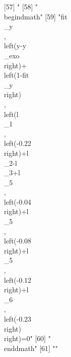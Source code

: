 [57] "%
[58] "\\begin{dmath}"                                                                                                                                                                                                                                                                                
[59] "{{fit\\_y}}\\, \\left({y}-{{y\\_exo}}\\right)+\\left(1-{{fit\\_y}}\\right)\\, \\left({{l\\_1}}\\, \\left(-0.22\\right)+{{l\\_2}}-{{l\\_3}}+{{l\\_5}}\\, \\left(-0.04\\right)+{{l\\_5}}\\, \\left(-0.08\\right)+{{l\\_5}}\\, \\left(-0.12\\right)+{{l\\_6}}\\, \\left(-0.23\\right)\\right)=0"  
[60] "\\end{dmath}"                                                                                                                                                                                                                                                                                  
[61] ""                                                                                                                                                                                                                                                                                              
